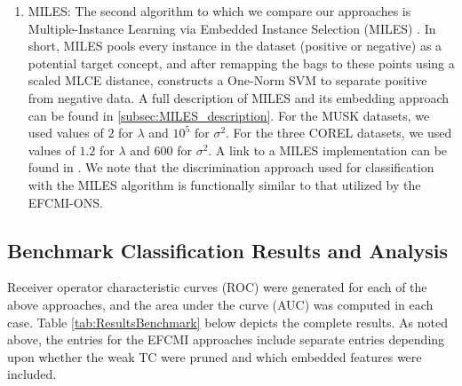 \documentclass[12pt,dvips]{report}
\numberwithin{equation}{section}
\begin{document}
\begin{enumerate}
	\item MILES: The second algorithm to which we compare our approaches is Multiple-Instance Learning via Embedded Instance Selection (MILES) \cite{chen06_miles}.  In short, MILES pools every instance in the dataset (positive or negative) as a potential target concept, and after remapping the bags to these points using a scaled MLCE distance, constructs a One-Norm SVM to separate positive from negative data.  A full description of MILES and its embedding approach can be found in \ref{subsec:MILES_description}.  For the MUSK datasets, we used values of $2$ for $\lambda$ and $10^{5}$ for $\sigma^{2}$.  For the three COREL datasets, we used values of $1.2$ for $\lambda$ and $600$ for $\sigma^{2}$.  A link to a MILES implementation can be found in \cite{chen06_miles}.  We note that the discrimination approach used for classification with the MILES algorithm is functionally similar to that utilized by the EFCMI-ONS.
\end{enumerate}

\subsection{Benchmark Classification Results and Analysis} \label{subsec:BenchmarkResults}

Receiver operator characteristic curves (ROC) were generated for each of the above approaches, and the area under the curve (AUC) was computed in each case.  Table \ref{tab:ResultsBenchmark} below depicts the complete results.  As noted above, the entries for the EFCMI approaches include separate entries depending upon whether the weak TC were pruned and which embedded features were included.  
\end{document}
